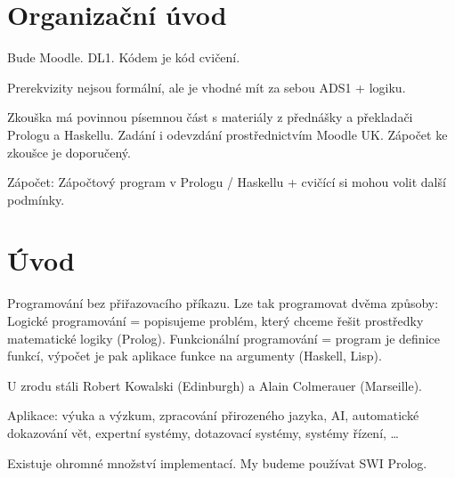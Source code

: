 \documentclass[12pt]{article}					%
\begin{document}

\section*{Organizační úvod}
\begin{poznamka}
	Bude Moodle. DL1. Kódem je kód cvičení.

	Prerekvizity nejsou formální, ale je vhodné mít za sebou ADS1 + logiku.

	Zkouška má povinnou písemnou část s materiály z přednášky a překladači Prologu a Haskellu. Zadání i odevzdání prostřednictvím Moodle UK. Zápočet ke zkoušce je doporučený.

	Zápočet: Zápočtový program v Prologu / Haskellu + cvičící si mohou volit další podmínky.
\end{poznamka}

\section{Úvod}
\begin{definice}
	Programování bez přiřazovacího příkazu. Lze tak programovat dvěma způsoby: Logické programování = popisujeme problém, který chceme řešit prostředky matematické logiky (Prolog). Funkcionální programování = program je definice funkcí, výpočet je pak aplikace funkce na argumenty (Haskell, Lisp).
\end{definice}

\begin{definice}[Prolog]
	U zrodu stáli Robert Kowalski (Edinburgh) a Alain Colmerauer (Marseille).

	Aplikace: výuka a výzkum, zpracování přirozeného jazyka, AI, automatické dokazování vět, expertní systémy, dotazovací systémy, systémy řízení, …

	Existuje ohromné množství implementací. My budeme používat SWI Prolog.
\end{definice}
\end{document}
